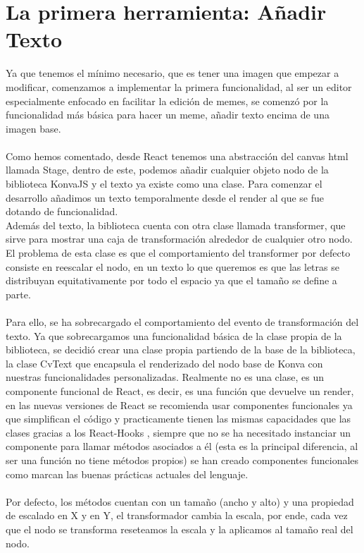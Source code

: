 \section{La primera herramienta: Añadir Texto}
Ya que tenemos el mínimo necesario, que es tener una imagen que empezar a modificar, 
comenzamos a implementar la primera funcionalidad, al ser un editor especialmente
enfocado en facilitar la edición de memes, se comenzó por la funcionalidad más básica
para hacer un meme, añadir texto encima de una imagen base.
\\\\
Como hemos comentado, desde React tenemos una abstracción del canvas html llamada Stage,
dentro de este, podemos añadir cualquier objeto nodo de la biblioteca KonvaJS y el texto
ya existe como una clase. Para comenzar el desarrollo añadimos un texto temporalmente
desde el render al que se fue dotando de funcionalidad.
\\
Además del texto, la biblioteca cuenta con otra clase llamada transformer, que sirve 
para mostrar una caja de transformación alrededor de cualquier otro nodo. El problema
de esta clase es que el comportamiento del transformer por defecto consiste en 
reescalar el nodo, en un texto lo que queremos es que las letras se distribuyan
equitativamente por todo el espacio ya que el tamaño se define a parte.
\\\\
Para ello, se ha sobrecargado el comportamiento del evento de transformación del texto.
Ya que sobrecargamos una funcionalidad básica de la clase propia de la biblioteca, se 
decidió crear una clase propia partiendo de la base de la biblioteca, la clase CvText
que encapsula el renderizado del nodo base de Konva con nuestras funcionalidades personalizadas.
Realmente no es una clase, es un componente funcional de React, es decir, es una 
función que devuelve un render, en las nuevas versiones de React se recomienda usar
componentes funcionales ya que simplifican el código y practicamente tienen las mismas
capacidades que las clases gracias a los React-Hooks \cite{React-Hooks}, siempre que 
no se ha necesitado instanciar un componente para llamar métodos asociados a él 
(esta es la principal diferencia, al ser una función no tiene métodos propios) se han
creado componentes funcionales como marcan las buenas prácticas actuales del lenguaje.
\\\\
Por defecto, los métodos cuentan con un tamaño (ancho y alto) y una propiedad de escalado
en X y en Y, el transformador cambia la escala, por ende, cada vez que el nodo se transforma
reseteamos la escala y la aplicamos al tamaño real del nodo. 

